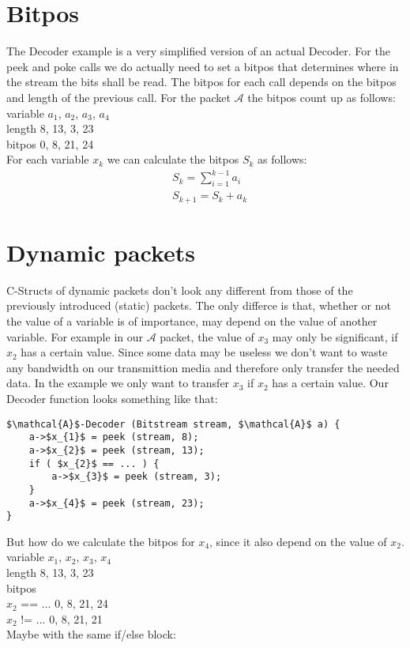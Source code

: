 \documentclass{article}
\begin{document}
	\section{Bitpos}
		The Decoder example is a very simplified version of an actual Decoder. For the peek and poke calls we do actually need to set a bitpos
		that determines where in the stream the bits shall be read. The bitpos for each call depends on the bitpos and length of the previous call.
		For the packet $\mathcal{A}$ the bitpos count up as follows:\\
		variable   $a_{1}$, $a_{2}$, $a_{3}$, $a_{4}$\\
		length      8, 13,  3, 23\\
		bitpos      0,  8, 21, 24\\
		For each variable $x_{k}$ we can calculate the bitpos $S_{k}$ as follows:
		\begin{align*}
			&S_{k} = \sum_{i=1}^{k-1} a_{i}\\
			&S_{k+1} = S_{k} + a_{k}
		\end{align*}
	\section{Dynamic packets}
		C-Structs of dynamic packets don't look any different from those of the previously introduced (static) packets.
		The only differce is that, whether or not the value of a variable is of importance, may depend on the value of another variable.	
		For example in our $\mathcal{A}$ packet, the value of $x_{3}$ may only be significant, if $x_{2}$ has a certain value.
		Since some data may be useless we don't want to waste any bandwidth on our transmittion media and therefore only transfer the needed data.
		In the example we only want to transfer $x_{3}$ if $x_{2}$ has a certain value.
		Our Decoder function looks something like that:

		\begin{lstlisting}[mathescape]
$\mathcal{A}$-Decoder (Bitstream stream, $\mathcal{A}$ a) {
	a->$x_{1}$ = peek (stream, 8);
	a->$x_{2}$ = peek (stream, 13);
	if ( $x_{2}$ == ... ) {
		a->$x_{3}$ = peek (stream, 3);
	}
	a->$x_{4}$ = peek (stream, 23);
}
		\end{lstlisting}

		But how do we calculate the bitpos for $x_{4}$, since it also depend on the value of $x_{2}$.\\
		variable   $x_{1}$, $x_{2}$, $x_{3}$, $x_{4}$\\
		length        8, 13, 3, 23\\
		bitpos\\
		$x_{2}$ == ...  0, 8, 21, 24\\
		$x_{2}$ != ...  0, 8, 21, 21\\
		Maybe with the same if/else block:
\end{document}
